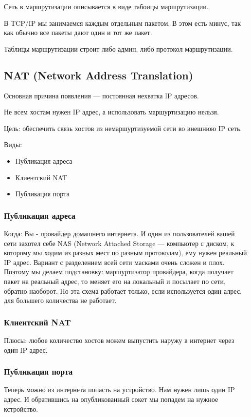 \documentclass[10pt,a4paper,oneside,titlepage]{report}
\theoremstyle{defenition}
\begin{document}
Сеть в маршрутизации описывается в виде табоицы маршрутизации. 

В TCP/IP мы занимаемся каждым отдельным пакетом. В этом есть минус, так как обычно все пакеты дают один и тот же пакет.

Таблицы маршрутизации строит либо админ, либо протокол маршрутизации. 

\subsection{NAT (Network Address Translation)}

Основная причина появления --- постоянная нехватка IP адресов.

Не всем хостам нужен IP адрес, а использовать маршуртизацию нельзя.

Цель: обеспечить связь хостов из немаршуртизуемой сети во внешнюю IP сеть.

Виды:
\begin{itemize}
	\item Публикация адреса
	\item Клиентский NAT
	\item Публикация порта
\end{itemize}

\subsubsection{Публикация адреса}

Когда: Вы - провайдер домашнего интернета. И один из пользователей вашей сети захотел себе NAS (Network Attached Storage --- компьютер с диском, к которому мы ходим из разных мест по разным протоколам), ему нужен реальный IP адрес. Вариант с разделением всей сети масками очень сложен и плох. Поэтому мы делаем подстановку: маршуртизатор провайдера, когда получает пакет на реальный адрес, то меняет его на локальный и посылает по сети, обратно наоборот. Но эта схема работает только, если используется один алрес, для большего количества не работает.


\subsubsection{Клиентский NAT}



Плюсы: любое количество хостов можем выпустить наружу в интернет через один IP адрес.

\subsubsection{Публикация порта}

Теперь можно из интернета попасть на устройство. Нам нужен лишь один IP адрес. И обратившись на опубликованный сокет мы попадем на нужное кстройство. 
\end{document}
